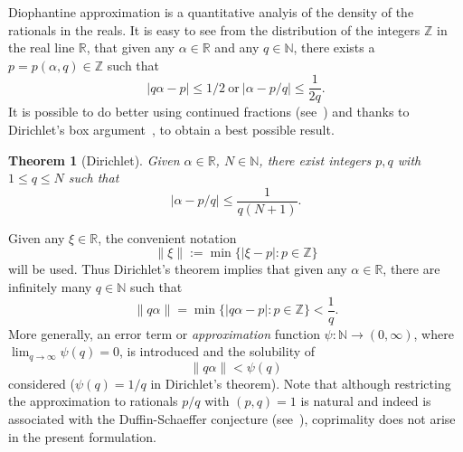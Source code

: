 \documentclass[reqno]{amsart}
\newtheorem{thm}{Theorem}
\renewcommand{\le}{\leqslant}
\newcommand{\al}{\alpha}
\newcommand{\R}{{\mathbb{R}}}
\newcommand{\N}{{\mathbb{N}}}
\newcommand{\Z}{{\mathbb{Z}}}
\newcommand{\0}{{\mathbf{0}}}
\newcommand{\DA}{Diophantine approximation}
\begin{document}
\DA{} is a quantitative analyis of the density of the rationals in the
reals.  It is easy to see from the distribution of the integers $\Z$
in the real line $\R$, that given any $\al\in\R$ and any $q\in\N$,
there exists a $p=p(\al,q)\in\Z$ such that
\begin{equation*}
  |q\al-p|\le 1/2 \ {\text{or} } \ |\al-p/q|\le \frac1{2q}.
\end{equation*}
It is possible to do better using continued
fractions (see~\cite{Casselshort,HW}) and thanks to Dirichlet's box
argument~\cite{HarmanMNT}, to obtain a best possible result.
\begin{thm}[Dirichlet]
 Given $\alpha\in\R$, $N\in\N$, there exist integers 
$p, q$ with $1\le q\le N$ such that
\begin{equation*}
   |\al-p/q|\le \frac1{q(N+1)}.
\end{equation*}
  \end{thm}
Given any $\xi\in\R$, the  convenient notation
\begin{equation*}
\|\xi\|:=\min\{|\xi - p|\colon p\in \Z\}   
\end{equation*}
will be used.  Thus Dirichlet's theorem implies that given any $\al\in\R$,
there are infinitely many $q\in\N$ such that
\begin{equation*}
  \|q\al\|= \min\{|q\alpha-p|\colon p\in\Z\} <\frac1{q}.
\end{equation*}
More generally, an error term or {\em approximation} function $
\psi\colon\N\to (0,\infty)$, where $\lim_{q\to\infty} \psi(q)=0$, is
introduced and the solubility of
\begin{equation}
\label{eq:psineq}
   \|q\al\| <  \psi(q)
\end{equation}
considered ($\psi(q)=1/q$ in Dirichlet's theorem).  Note that although
restricting the approximation to rationals $p/q$ with $(p,q)=1$ is
natural and indeed is associated with the Duffin-Schaeffer conjecture
(see~\cite{DuffinSchaeffer}), coprimality does not arise in the present
formulation.
\end{document}
